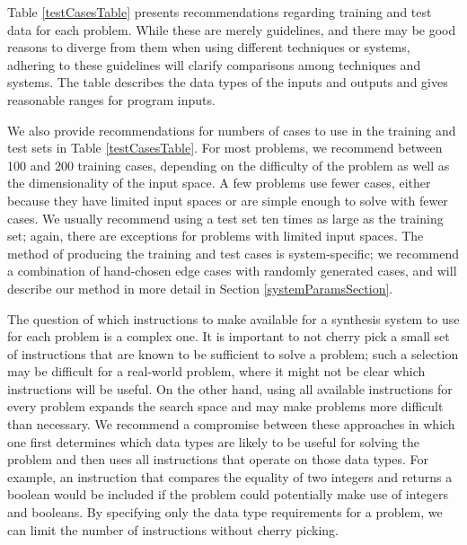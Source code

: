 \documentclass{sig-alternate}
\begin{document}
Table \ref{testCasesTable} presents recommendations regarding training and test data for each problem. While these are merely guidelines, and there may be good reasons to diverge from them when using different techniques or systems, adhering to these guidelines will clarify comparisons among techniques and systems. The table describes the data types of the inputs and outputs and gives reasonable ranges for program inputs. 

We also provide recommendations for numbers of cases to use in the training and test sets in Table \ref{testCasesTable}. For most problems, we recommend between 100 and 200 training cases, depending on the difficulty of the problem as well as the dimensionality of the input space. A few problems use fewer cases, either because they have limited input spaces or are simple enough to solve with fewer cases. We usually recommend using a test set ten times as large as the training set; again, there are exceptions for problems with limited input spaces. The method of producing the training and test cases is system-specific; we recommend a combination of hand-chosen edge cases with randomly generated cases, and will describe our method in more detail in Section \ref{systemParamsSection}.


The question of which instructions to make available for a synthesis system to use for each problem is a complex one. It is important to not cherry pick a small set of instructions that are known to be sufficient to solve a problem; such a selection may be difficult for a real-world problem, where it might not be clear which instructions will be useful. On the other hand, using all available instructions for every problem expands the search space and may make problems more difficult than necessary. We recommend a compromise between these approaches
in which one first determines which data types are likely to be useful for solving the problem and then uses all instructions that operate on those data types.
For example, an instruction that compares the equality of two integers and returns a boolean would be included if the problem could potentially make use of integers and booleans. 
By specifying only the data type requirements for a problem, we can limit the number of instructions without cherry picking. 
\end{document}
